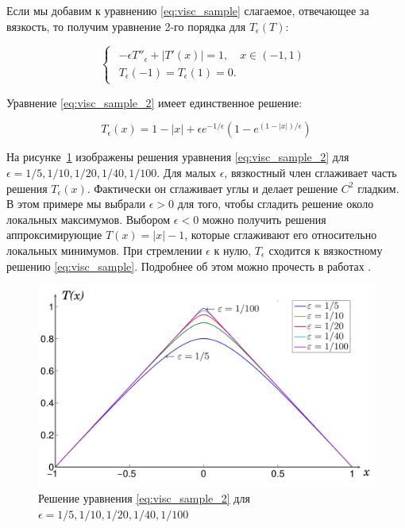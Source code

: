 \documentclass[a4paper,12pt]{article}
\begin{document}
Если мы добавим к уравнению \eqref{eq:visc_sample} слагаемое,
отвечающее за вязкость, то получим уравнение 2-го порядка для
$T_\epsilon(T)$:

\begin{equation}
  \label{eq:visc_sample_2}
  \begin{cases}
    \begin{array}{ll}
      -\epsilon T''_\epsilon+|T'(x)| = 1,\quad x \in (-1,1) \\
      T_\epsilon(-1) = T_\epsilon(1) = 0.
    \end{array}
  \end{cases}
\end{equation}

Уравнение \eqref{eq:visc_sample_2} имеет единственное решение:

\begin{equation*}
  T_\epsilon(x) = 1 - |x| + \epsilon e^{-1/\epsilon}(1 - e^{(1-|x|)/\epsilon})
\end{equation*}


На рисунке~\ref{fig:viscosity-experiment} изображены решения уравнения
\eqref{eq:visc_sample_2} для $\epsilon =
1/5,1/10,1/20,1/40,1/100$. Для малых $\epsilon$, вязкостный член
сглаживает часть решения $T_\epsilon(x)$. Фактически он сглаживает
углы и делает решение $C^2$ гладким. В этом примере мы выбрали
$\epsilon >0$ для того, чтобы сгладить решение около локальных
максимумов. Выбором $\epsilon <0$ можно получить решения
аппроксимирующие $T(x) = |x| - 1$, которые сглаживают его относительно
локальных минимумов. При стремлении $\epsilon$ к нулю, $T_\epsilon$
сходится к вязкостному решению \eqref{eq:visc_sample}. Подробнее об
этом можно прочесть в работах \cite{V1984,V1983}.


\begin{figure}[h]
  \centering
  \includegraphics[width=0.6\linewidth]{viscosity_example.png}
  \hfil \caption{Решение уравнения \eqref{eq:visc_sample_2} 
	для $\epsilon = 1/5, 1/10, 1/20, 1/40, 1/100$}
  \label{fig:viscosity-experiment}

\end{figure}
\end{document}
